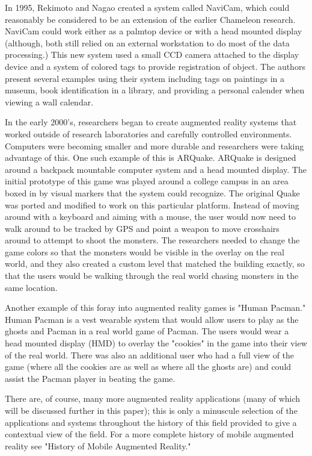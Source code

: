 \documentclass{acm_proc_article-sp}
\begin{document}
In 1995, Rekimoto and Nagao created a system called NaviCam, which could reasonably be considered to be an extension of the earlier Chameleon research. \cite{fitzmaurice1993situated}  NaviCam could work either as a palmtop device or with a head mounted display (although, both still relied on an external workstation to do most of the data processing.)  This new system used a small CCD camera attached to the display device and a system of colored tags to provide registration of object.  The authors present several examples using their system including tags on paintings in a museum, book identification in a library, and providing a personal calender when viewing a wall calendar. \cite{rekimoto1995world}

In the early 2000's, researchers began to create augmented reality systems that worked outside of research laboratories and carefully controlled environments.  Computers were becoming smaller and more durable and researchers were taking advantage of this. One such example of this is ARQuake.  ARQuake is designed around a backpack mountable computer system and a head mounted display.  The initial prototype of this game was played around a college campus in an area boxed in by visual markers that the system could recognize. The original Quake was ported and modified to work on this particular platform.  Instead of moving around with a keyboard and aiming with a mouse, the user would now need to walk around to be tracked by GPS and point a weapon to move crosshairs around to attempt to shoot the monsters.  The researchers needed to change the game colors so that the monsters would be visible in the overlay on the real world, and they also created a custom level that matched the building exactly, so that the users would be walking through the real world chasing monsters in the same location.  \cite{thomas2000arquake}

Another example of this foray into augmented reality games is "Human Pacman."  Human Pacman is a vest wearable system that would allow users to play as the ghosts and Pacman in a real world game of Pacman.  The users would wear a head mounted display (HMD) to overlay the "cookies" in the game into their view of the real world.  There was also an additional user who had a full view of the game (where all the cookies are as well as where all the ghosts are) and could assist the Pacman player in beating the game.  \cite{cheok2004human}

There are, of course, many more augmented reality applications (many of which will be discussed further in this paper); this is only a minuscule selection of the applications and systems throughout the history of this field provided to give a contextual view of the field.  For a more complete history of mobile augmented reality see "History of Mobile Augmented Reality." \cite{hist.ar}
\end{document}
